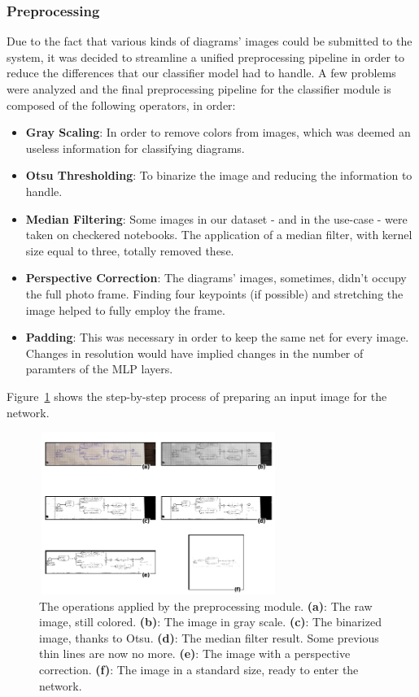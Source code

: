 \documentclass[conference]{IEEEtran}
\begin{document}
\subsubsection{Preprocessing}
Due to the fact that various kinds of diagrams' images could be submitted to the system, it was decided to streamline a unified preprocessing pipeline in order to reduce the differences that our classifier model had to handle. A few problems were analyzed and the final preprocessing pipeline for the classifier module is composed of the following operators, in order:
\begin{itemize}
	\item \textbf{Gray Scaling}: In order to remove colors from images, which was deemed an useless information for classifying diagrams.
	\item \textbf{Otsu Thresholding}: To binarize the image and reducing the information to handle.
	\item \textbf{Median Filtering}: Some images in our dataset - and in the use-case - were taken on checkered notebooks. The application of a median filter, with kernel size equal to three, totally removed these.
	\item \textbf{Perspective Correction}: The diagrams' images, sometimes, didn't occupy the full photo frame. Finding four keypoints (if possible) and stretching the image helped to fully employ the frame.
	\item \textbf{Padding}: This was necessary in order to keep the same net for every image. Changes in resolution would have implied changes in the number of paramters of the MLP layers.
\end{itemize}

Figure~\ref{fig:classifier_preprocessing} shows the step-by-step process of preparing an input image for the network.

\begin{figure}[H]
	\centering
	\includegraphics[width=220pt, height=150pt]{classifier_preprocessing.png}
	\caption{
		The operations applied by the preprocessing module.
		\textbf{(a)}: The raw image, still colored.
		\textbf{(b)}: The image in gray scale.
		\textbf{(c)}: The binarized image, thanks to Otsu.
		\textbf{(d)}: The median filter result. Some previous thin lines are now no more.
		\textbf{(e)}: The image with a perspective correction.
		\textbf{(f)}: The image in a standard size, ready to enter the network.
	}
	\label{fig:classifier_preprocessing}
\end{figure}
\end{document}
